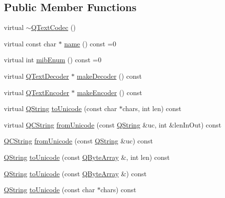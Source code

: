 \subsection*{Public Member Functions}
\begin{DoxyCompactItemize}
\item 
virtual \mbox{\hyperlink{class_q_text_codec_af84836a011269c9eb67241cf8c638d83}{$\sim$\+Q\+Text\+Codec}} ()
\item 
virtual const char $\ast$ \mbox{\hyperlink{class_q_text_codec_a5b735ce19dc6b0fb0e8858bd3f54f0e2}{name}} () const =0
\item 
virtual int \mbox{\hyperlink{class_q_text_codec_aa0118daa4f82235ae9d5bb70a168c992}{mib\+Enum}} () const =0
\item 
virtual \mbox{\hyperlink{class_q_text_decoder}{Q\+Text\+Decoder}} $\ast$ \mbox{\hyperlink{class_q_text_codec_abb65882aa316a2ad49a10e9f86c4dc88}{make\+Decoder}} () const
\item 
virtual \mbox{\hyperlink{class_q_text_encoder}{Q\+Text\+Encoder}} $\ast$ \mbox{\hyperlink{class_q_text_codec_aa7dccd7fc1b578de0b7599b040d98e11}{make\+Encoder}} () const
\item 
virtual \mbox{\hyperlink{class_q_string}{Q\+String}} \mbox{\hyperlink{class_q_text_codec_aafe2c454ae7cbbf3d84a7ca26f775c49}{to\+Unicode}} (const char $\ast$chars, int len) const
\item 
virtual \mbox{\hyperlink{class_q_c_string}{Q\+C\+String}} \mbox{\hyperlink{class_q_text_codec_a564dc8bf15241a165a38287c1d26e48c}{from\+Unicode}} (const \mbox{\hyperlink{class_q_string}{Q\+String}} \&uc, int \&len\+In\+Out) const
\item 
\mbox{\hyperlink{class_q_c_string}{Q\+C\+String}} \mbox{\hyperlink{class_q_text_codec_aef301197e6d6ba41a95bd7ba9d3d3390}{from\+Unicode}} (const \mbox{\hyperlink{class_q_string}{Q\+String}} \&uc) const
\item 
\mbox{\hyperlink{class_q_string}{Q\+String}} \mbox{\hyperlink{class_q_text_codec_a1fcc01c732e02555849e2823f57606d8}{to\+Unicode}} (const \mbox{\hyperlink{class_q_array}{Q\+Byte\+Array}} \&, int len) const
\item 
\mbox{\hyperlink{class_q_string}{Q\+String}} \mbox{\hyperlink{class_q_text_codec_a1e26050752c19acb5b623109f301d3de}{to\+Unicode}} (const \mbox{\hyperlink{class_q_array}{Q\+Byte\+Array}} \&) const
\item 
\mbox{\hyperlink{class_q_string}{Q\+String}} \mbox{\hyperlink{class_q_text_codec_ae7f9ae7d3a759d49e050676d4cb69fdc}{to\+Unicode}} (const char $\ast$chars) const

\end{DoxyCompactItemize}
